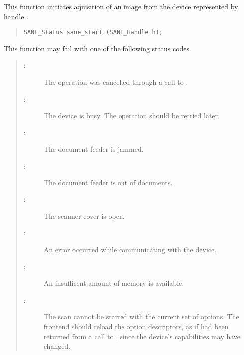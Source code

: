 \documentclass[11pt,DVIps]{report}
\begin{document}
This function initiates aquisition of an image from the device
represented by handle .
\begin{quote}
\begin{verbatim}
SANE_Status sane_start (SANE_Handle h);
\end{verbatim}
\end{quote}
This function may fail with one of the following status codes.
\begin{quote}
\begin{description}
\item[:] The operation was cancelled through
  a call to .
\item[:] The device is busy. The
  operation should be retried later.
\item[:] The document feeder is jammed.
\item[:] The document feeder is out of
  documents.
\item[:] The scanner cover is open.
\item[:] An error occurred while communicating
  with the device.
\item[:] An insufficent amount of memory
  is available.
\item[:] The scan cannot be started with the current
  set of options. The frontend should reload the option descriptors, as if
   had been returned from a call to
  , since the device's capabilities may have
  changed.
\end{description}
\end{quote}


\subsection{}
\end{document}

